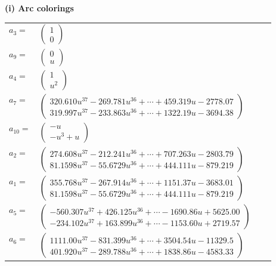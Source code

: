 \documentclass[1p]{elsarticle_modified}
\theoremstyle{definition}
\begin{document}
\flushleft \textbf{(i) Arc colorings}\\
\begin{tabular}{m{7pt} m{180pt} m{7pt} m{180pt} }
\flushright $a_{3}=$&$\begin{pmatrix}1\\0\end{pmatrix}$ \\
\flushright $a_{9}=$&$\begin{pmatrix}0\\u\end{pmatrix}$ \\
\flushright $a_{4}=$&$\begin{pmatrix}1\\u^2\end{pmatrix}$ \\
\flushright $a_{7}=$&$\begin{pmatrix}320.610 u^{37}-269.781 u^{36}+\cdots+459.319 u-2778.07\\319.997 u^{37}-233.863 u^{36}+\cdots+1322.19 u-3694.38\end{pmatrix}$ \\
\flushright $a_{10}=$&$\begin{pmatrix}- u\\- u^3+u\end{pmatrix}$ \\
\flushright $a_{2}=$&$\begin{pmatrix}274.608 u^{37}-212.241 u^{36}+\cdots+707.263 u-2803.79\\81.1598 u^{37}-55.6729 u^{36}+\cdots+444.111 u-879.219\end{pmatrix}$ \\
\flushright $a_{1}=$&$\begin{pmatrix}355.768 u^{37}-267.914 u^{36}+\cdots+1151.37 u-3683.01\\81.1598 u^{37}-55.6729 u^{36}+\cdots+444.111 u-879.219\end{pmatrix}$ \\
\flushright $a_{5}=$&$\begin{pmatrix}-560.307 u^{37}+426.125 u^{36}+\cdots-1690.86 u+5625.00\\-234.102 u^{37}+163.899 u^{36}+\cdots-1153.60 u+2719.57\end{pmatrix}$ \\
\flushright $a_{6}=$&$\begin{pmatrix}1111.00 u^{37}-831.399 u^{36}+\cdots+3504.54 u-11329.5\\401.920 u^{37}-289.788 u^{36}+\cdots+1838.86 u-4583.33\end{pmatrix}$ \\

\end{tabular}
\end{document}
